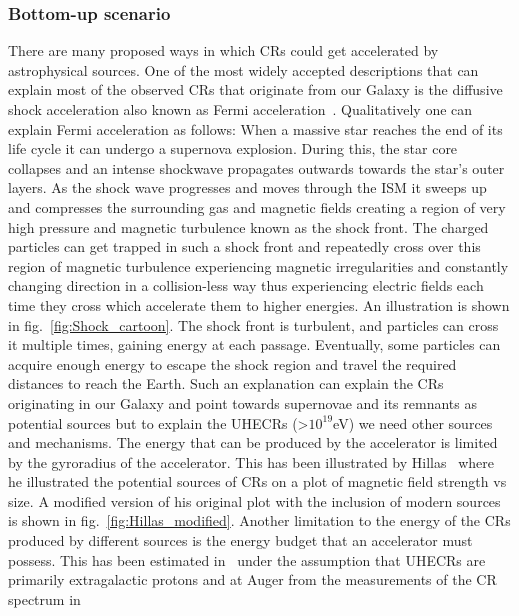 \subsubsection{Bottom-up scenario}
\label{subsec:Bupsce}
There are many proposed ways in which \glspl{CR} could get accelerated by astrophysical sources. One of the most widely accepted descriptions that can explain most of the observed \glspl{CR} that originate from our Galaxy is the diffusive shock acceleration also known as Fermi acceleration~\cite{PhysRev.75.1169}. Qualitatively one can explain Fermi acceleration as follows: When a massive star reaches the end of its life cycle it can undergo a supernova explosion. During this, the star core collapses and an intense shockwave propagates outwards towards the star's outer layers. As the shock wave progresses and moves through the \gls{ISM} it sweeps up and compresses the surrounding gas and magnetic fields creating a region of very high pressure and magnetic turbulence known as the shock front. The charged particles can get trapped in such a shock front and repeatedly cross over this region of magnetic turbulence experiencing magnetic irregularities and constantly changing direction in a collision-less way thus experiencing electric fields each time they cross which accelerate them to higher energies. An illustration is shown in fig.~\ref{fig:Shock_cartoon}. The shock front is turbulent, and particles can cross it multiple times, gaining energy at each passage. Eventually, some particles can acquire enough energy to escape the shock region and travel the required distances to reach the Earth. Such an explanation can explain the \glspl{CR} originating in our Galaxy and point towards supernovae and its remnants as potential sources but to explain the \glspl{UHECR} (>$10^{19}$eV) we need other sources and mechanisms. The energy that can be produced by the accelerator is limited by the gyroradius of the accelerator. This has been illustrated by Hillas~\cite{1984ARA&A..22..425H} where he illustrated the potential sources of \glspl{CR} on a plot of magnetic field strength vs size. A modified version of his original plot with the inclusion of modern sources is shown in fig.~\ref{fig:Hillas_modified}. Another limitation to the energy of the \glspl{CR} produced by different sources is the energy budget that an accelerator must possess. This has been estimated in~\cite{Murase:2008sa} under the assumption that \glspl{UHECR} are primarily extragalactic protons and at Auger from the measurements of the CR spectrum in~\cite{2018_auger_comp_spec}

